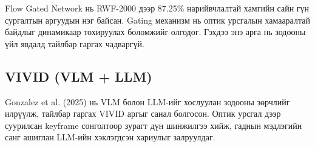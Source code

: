 Flow Gated Network нь RWF-2000 дээр 87.25\% нарийвчлалтай хамгийн сайн гүн сургалтын аргуудын нэг байсан. Gating механизм нь оптик урсгалын хамааралтай байдлыг динамикаар тохируулах боломжийг олгодог. Гэхдээ энэ арга нь зодооны үйл явдалд тайлбар гаргах чадваргүй.

\subsection*{VIVID (VLM + LLM)}

Gonzalez et al. (2025) нь VLM болон LLM-ийг хослуулан зодооны зөрчлийг илрүүлж,
тайлбар гаргах VIVID аргыг санал болгосон. Оптик урсгал дээр суурилсан keyframe
сонголтоор зурагт дүн шинжилгээ хийж, гаднын мэдлэгийн санг ашиглан LLM-ийн
хэклэгдсэн хариулыг залруулдаг.

